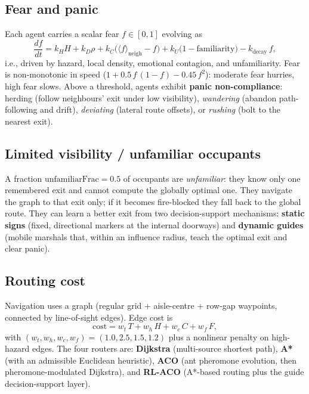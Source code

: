 \documentclass[11pt,a4paper]{article}
\begin{document}
\subsection{Fear and panic}
Each agent carries a scalar fear $f\in[0,1]$ evolving as
\begin{equation}
\frac{df}{dt} = k_H H + k_D \rho + k_C\bigl(\langle f\rangle_{\text{neigh}} - f\bigr)
+ k_U\bigl(1 - \text{familiarity}\bigr) - k_{\text{decay}}\, f,
\end{equation}
i.e., driven by hazard, local density, emotional contagion, and unfamiliarity. Fear is
non-monotonic in speed ($1 + 0.5\,f\,(1-f) - 0.45\,f^2$): moderate fear hurries, high fear slows.
Above a threshold, agents exhibit \textbf{panic non-compliance}: herding (follow neighbours' exit
under low visibility), \emph{wandering} (abandon path-following and drift), \emph{deviating}
(lateral route offsets), or \emph{rushing} (bolt to the nearest exit).

\subsection{Limited visibility / unfamiliar occupants}
A fraction $\mathrm{unfamiliarFrac}=0.5$ of occupants are \emph{unfamiliar}: they know only one
remembered exit and cannot compute the globally optimal one. They navigate the graph to that exit
only; if it becomes fire-blocked they fall back to the global route. They can learn a better exit
from two decision-support mechanisms: \textbf{static signs} (fixed, directional markers at the
internal doorways) and \textbf{dynamic guides} (mobile marshals that, within an influence radius,
teach the optimal exit and clear panic).

\subsection{Routing cost}
Navigation uses a graph (regular grid + aisle-centre + row-gap waypoints, connected by
line-of-sight edges). Edge cost is
\begin{equation}
\text{cost} = w_t\,T + w_h\,H + w_c\,C + w_f\,F,
\end{equation}
with $(w_t,w_h,w_c,w_f)=(1.0,2.5,1.5,1.2)$ plus a nonlinear penalty on high-hazard edges. The four
routers are: \textbf{Dijkstra} (multi-source shortest path), \textbf{A*} (with an admissible
Euclidean heuristic), \textbf{ACO} (ant pheromone evolution, then pheromone-modulated Dijkstra),
and \textbf{RL-ACO} (A*-based routing plus the guide decision-support layer).
\end{document}
